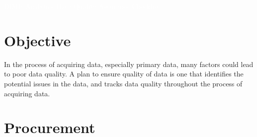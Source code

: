 \documentclass{report}
\newcommand{\titleBox}[1]{
	\begin{tcolorbox}
		[colframe = fontcolor,
		colback = fontcolor,
		sharp corners,
		halign = flush center,
		valign = center,
		height = 0.2\textwidth,
		after skip = 1cm]
		#1
	\end{tcolorbox}
}
\begin{document}
	\titleBox{
			\textcolor{white}{\Large{DIME Analytics Data Quality Assurance Checklist}}
	}

		\section*{Objective}
		In the process of acquiring data, especially primary data, many factors could lead to poor data quality. A plan to ensure quality of data is one that identifies the potential issues in the data, and tracks data quality throughout the process of acquiring data.
	
	\vspace{5mm} %
		\section*{Procurement}


\newcommand{\makerow}[1]{%
	#1 &
	\stepcounter{row}%
	\mbox{\CheckBox[print,name=YES\therow, width=0.7em, height=0.7em]{}} &
	\mbox{\CheckBox[print,name=NO\therow, width=0.7em, height=0.7em]{}} &
	\mbox{\CheckBox[print,name=N/A\therow, width=0.7em, height=0.7em]{}} \\
}
\end{document}
